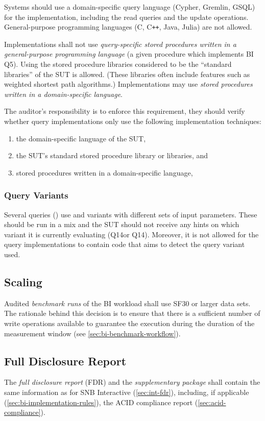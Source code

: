 Systems should use a domain-specific query language (\eg Cypher, Gremlin, GSQL) for the implementation, including the read queries and the update operations.
General-purpose programming languages (\eg C, C\texttt{++}, Java, Julia) are not allowed.

Implementations shall not use \emph{query-specific stored procedures written in a general-purpose programming language} (\eg a given procedure which implements BI Q5).
Using the stored procedure libraries considered to be the ``standard libraries'' of the SUT is allowed. (These libraries often include features such as weighted shortest path algorithms.)
Implementations may use \emph{stored procedures written in a domain-specific language}.

The auditor's responsibility is to enforce this requirement, \ie they should verify whether query implementations only use the following implementation techniques:
\begin{enumerate}
    \item the domain-specific language of the SUT,
    \item the SUT's standard stored procedure library or libraries, and
    \item stored procedures written in a domain-specific language,
\end{enumerate}

\subsubsection{Query Variants}
\label{sec:bi-query-variants}

Several queries (\eg {}) use \variantA and \variantB variants with different sets of input parameters.
These should be run in a mix and the SUT should not receive any hints on which variant it is currently evaluating (\eg Q14\variantA or Q14\variantB).
Moreover, it is not allowed for the query implementations to contain code that aims to detect the query variant used.

\subsection{Scaling}
\label{sec:bi-scaling}

Audited \emph{benchmark runs} of the BI workload shall use SF30 or larger data sets.
The rationale behind this decision is to ensure that there is a sufficient number of write operations available to guarantee the execution during the duration of the measurement window (see \autoref{sec:bi-benchmark-workflow}).

\subsection{Full Disclosure Report}
\label{sec:bi-fdr}

The \emph{full disclosure report} (FDR) and the \emph{supplementary package} shall contain
the same information as for SNB Interactive (\autoref{sec:int-fdr}),
including, if applicable (\autoref{sec:bi-implementation-rules}), the ACID compliance report (\autoref{sec:acid-compliance}).
